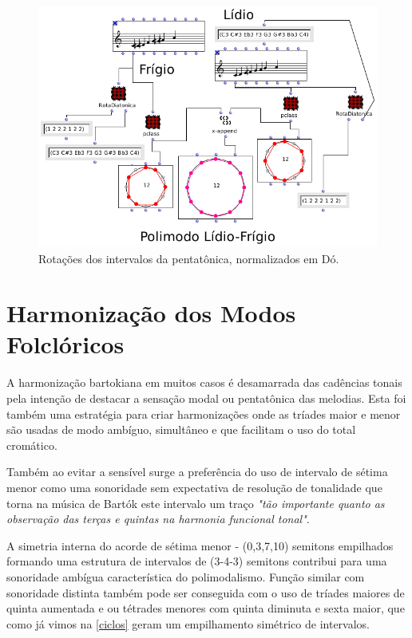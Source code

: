 \documentclass[
	12pt,				%
	openright,			%
	twoside,			%
	a4paper,			%
	english,			%
	french,				%
	spanish,			%
	brazil				%
	]{abntex2}
\begin{document}
\begin{figure}[!h]
	\caption{\label{fig_grafico}Rotações dos intervalos da pentatônica, normalizados em Dó. }
	\begin{center}
	    \includegraphics[scale=0.5]{modal/lidiofrigioOM.png}
	\end{center}
\end{figure}


\section{Harmonização dos Modos Folclóricos}


A harmonização  bartokiana em muitos casos é desamarrada das cadências tonais pela intenção de destacar a sensação modal ou pentatônica das melodias. Esta foi também uma estratégia para criar harmonizações onde as tríades maior e menor são usadas de modo ambíguo, simultâneo e que facilitam o uso do total cromático. 

Também ao evitar a sensível surge a preferência do uso de intervalo de sétima menor como uma sonoridade sem expectativa de resolução de tonalidade que torna na música de Bartók este intervalo um traço \textit{"tão importante quanto as observação das terças e quintas na harmonia funcional tonal"}\cite[p. 28]{antokoletz1984music}. 

A simetria interna do acorde de sétima menor - (0,3,7,10) semitons empilhados formando uma estrutura de intervalos de (3-4-3) semitons contribui para uma sonoridade ambígua característica do polimodalismo. Função similar com sonoridade distinta também pode ser conseguida com o uso de tríades maiores de quinta aumentada e ou tétrades menores com quinta diminuta e sexta maior, que como já vimos na \autoref{ciclos} geram um empilhamento simétrico de intervalos.
\end{document}
